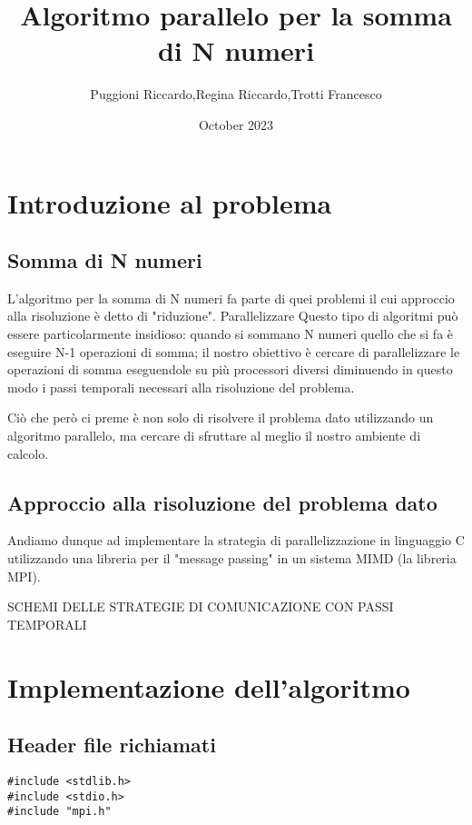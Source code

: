 \documentclass{article}
\title{Algoritmo parallelo per la somma di N numeri}
\author{Puggioni Riccardo,Regina Riccardo,Trotti Francesco }
\date{October 2023}
\begin{document}
\maketitle

\section{Introduzione al problema}
\subsection{Somma di N numeri}
    L'algoritmo per la somma di N numeri fa parte di quei problemi
    il cui approccio alla risoluzione è detto di "riduzione".
    Parallelizzare Questo tipo di algoritmi può essere particolarmente insidioso:
    quando si sommano N numeri quello che si fa è eseguire N-1
    operazioni di somma; il nostro obiettivo è cercare di parallelizzare le operazioni di somma eseguendole su più processori diversi diminuendo in questo modo i passi temporali necessari alla risoluzione del problema.

    Ciò che però ci preme è non solo di risolvere il problema
    dato utilizzando un algoritmo parallelo, ma cercare di sfruttare al meglio il nostro ambiente di calcolo.
\subsection{Approccio alla risoluzione del problema dato}

   

    Andiamo dunque ad implementare la strategia di parallelizzazione in linguaggio C utilizzando una libreria per il "message passing" in un sistema MIMD (la libreria MPI).

    SCHEMI DELLE STRATEGIE DI COMUNICAZIONE CON PASSI TEMPORALI

\clearpage
\section{Implementazione dell'algoritmo}
\subsection{Header file richiamati}
\begin{lstlisting}
#include <stdlib.h>
#include <stdio.h>
#include "mpi.h"
\end{lstlisting}
\end{document}
